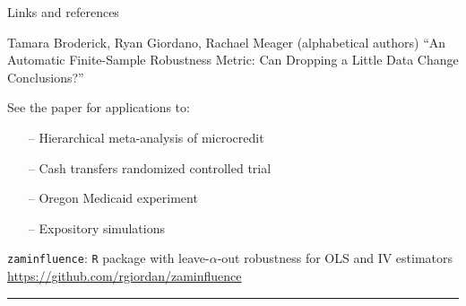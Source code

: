 \begin{frame}{Links and references}

\footnotesize

Tamara Broderick, Ryan Giordano, Rachael Meager (alphabetical authors) \newline
``An Automatic Finite-Sample Robustness Metric: Can Dropping a Little Data Change Conclusions?''

See the paper for applications to:
\vspace{-1em}
\begin{itemize}
    \item[--] Hierarchical meta-analysis of microcredit \citep{meager2020aggregating} \vspace{-0.5em}
    \item[--] Cash transfers randomized controlled trial \citep{angelucci2009indirect} \vspace{-0.5em}
    \item[--] Oregon Medicaid experiment \citep{finkelstein2012oregon} \vspace{-0.5em}
    \item[--] Expository simulations
\end{itemize}


%
%
\texttt{zaminfluence}: \texttt{R} package with leave-$\alpha$-out
robustness for OLS and IV estimators \newline
{\color{blue}\url{https://github.com/rgiordan/zaminfluence}}
\vspace{-0.5em}

\par\noindent\rule{\textwidth}{0.4pt}

\vspace{-0.5em}


\begingroup
\renewcommand{\section}[2]{}%
{
\tiny

}
\endgroup

\end{frame}
